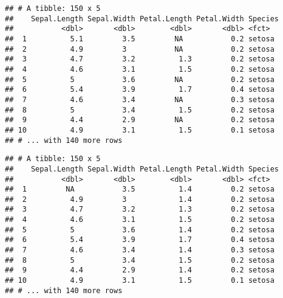 \documentclass[]{book}
\newenvironment{Shaded}{\begin{snugshade}}{\end{snugshade}}
\newcommand{\DataTypeTok}[1]{\textcolor[rgb]{0.13,0.29,0.53}{#1}}
\newcommand{\FloatTok}[1]{\textcolor[rgb]{0.00,0.00,0.81}{#1}}
\newcommand{\KeywordTok}[1]{\textcolor[rgb]{0.13,0.29,0.53}{\textbf{#1}}}
\newcommand{\NormalTok}[1]{#1}
\newcommand{\OperatorTok}[1]{\textcolor[rgb]{0.81,0.36,0.00}{\textbf{#1}}}
\newcommand{\StringTok}[1]{\textcolor[rgb]{0.31,0.60,0.02}{#1}}
\begin{document}
\begin{Shaded}
\end{Shaded}

\begin{verbatim}
## # A tibble: 150 x 5
##    Sepal.Length Sepal.Width Petal.Length Petal.Width Species
##           <dbl>       <dbl>        <dbl>       <dbl> <fct>  
##  1          5.1         3.5         NA           0.2 setosa 
##  2          4.9         3           NA           0.2 setosa 
##  3          4.7         3.2          1.3         0.2 setosa 
##  4          4.6         3.1          1.5         0.2 setosa 
##  5          5           3.6         NA           0.2 setosa 
##  6          5.4         3.9          1.7         0.4 setosa 
##  7          4.6         3.4         NA           0.3 setosa 
##  8          5           3.4          1.5         0.2 setosa 
##  9          4.4         2.9         NA           0.2 setosa 
## 10          4.9         3.1          1.5         0.1 setosa 
## # ... with 140 more rows
\end{verbatim}

\begin{Shaded}
\end{Shaded}

\begin{verbatim}
## # A tibble: 150 x 5
##    Sepal.Length Sepal.Width Petal.Length Petal.Width Species
##           <dbl>       <dbl>        <dbl>       <dbl> <fct>  
##  1         NA           3.5          1.4         0.2 setosa 
##  2          4.9         3            1.4         0.2 setosa 
##  3          4.7         3.2          1.3         0.2 setosa 
##  4          4.6         3.1          1.5         0.2 setosa 
##  5          5           3.6          1.4         0.2 setosa 
##  6          5.4         3.9          1.7         0.4 setosa 
##  7          4.6         3.4          1.4         0.3 setosa 
##  8          5           3.4          1.5         0.2 setosa 
##  9          4.4         2.9          1.4         0.2 setosa 
## 10          4.9         3.1          1.5         0.1 setosa 
## # ... with 140 more rows
\end{verbatim}
\end{document}
